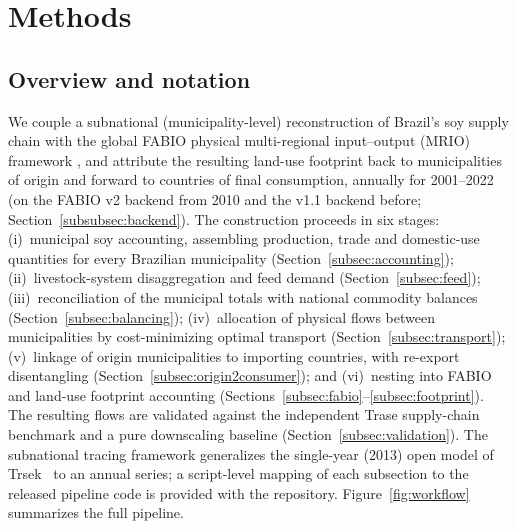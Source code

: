 \section{Methods}\label{sec:methods}

\subsection{Overview and notation}\label{subsec:overview}
We couple a subnational (municipality-level) reconstruction of Brazil's soy
supply chain with the global FABIO physical multi-regional
input--output (MRIO) framework \cite{bruckner2019fabio}, and attribute the
resulting land-use footprint back to municipalities of origin and forward to
countries of final consumption, annually for 2001--2022 (on the FABIO v2
backend from 2010 and the v1.1 backend before;
Section~\ref{subsubsec:backend}). The construction
proceeds in six stages: (i)~municipal soy accounting, assembling production,
trade and domestic-use quantities for every Brazilian municipality
(Section~\ref{subsec:accounting}); (ii)~livestock-system disaggregation and
feed demand (Section~\ref{subsec:feed}); (iii)~reconciliation of the municipal
totals with national commodity balances (Section~\ref{subsec:balancing});
(iv)~allocation of physical flows between municipalities by cost-minimizing
optimal transport (Section~\ref{subsec:transport}); (v)~linkage of origin
municipalities to importing countries, with re-export disentangling
(Section~\ref{subsec:origin2consumer}); and (vi)~nesting into FABIO
and land-use footprint accounting
(Sections~\ref{subsec:fabio}--\ref{subsec:footprint}). The resulting flows are
validated against the independent Trase supply-chain benchmark and a
pure downscaling baseline (Section~\ref{subsec:validation}). The subnational
tracing framework generalizes the single-year (2013) open model of
Trsek~\cite{trsek2022} to an annual series; a script-level mapping of each
subsection to the released pipeline code is provided with the repository.
Figure~\ref{fig:workflow} summarizes the full pipeline.

